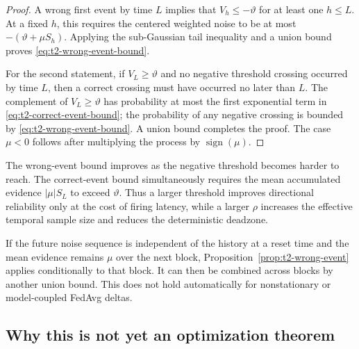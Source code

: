 \begin{proof}
A wrong first event by time $L$ implies that $V_h\leq-\vartheta$ for at least one $h\leq L$. At a fixed $h$, this requires the centered weighted noise to be at most $-(\vartheta+\mu S_h)$. Applying the sub-Gaussian tail inequality and a union bound proves \eqref{eq:t2-wrong-event-bound}.

For the second statement, if $V_L\geq\vartheta$ and no negative threshold crossing occurred by time $L$, then a correct crossing must have occurred no later than $L$. The complement of $V_L\geq\vartheta$ has probability at most the first exponential term in \eqref{eq:t2-correct-event-bound}; the probability of any negative crossing is bounded by \eqref{eq:t2-wrong-event-bound}. A union bound completes the proof. The case $\mu<0$ follows after multiplying the process by $\operatorname{sign}(\mu)$.
\end{proof}

\begin{remark}
The wrong-event bound improves as the negative threshold becomes harder to reach. The correct-event bound simultaneously requires the mean accumulated evidence $|\mu|S_L$ to exceed $\vartheta$. Thus a larger threshold improves directional reliability only at the cost of firing latency, while a larger $\rho$ increases the effective temporal sample size and reduces the deterministic deadzone.
\end{remark}

\begin{remark}
If the future noise sequence is independent of the history at a reset time and the mean evidence remains $\mu$ over the next block, Proposition~\ref{prop:t2-wrong-event} applies conditionally to that block. It can then be combined across blocks by another union bound. This does not hold automatically for nonstationary or model-coupled FedAvg deltas.
\end{remark}

\subsection{Why this is not yet an optimization theorem}

